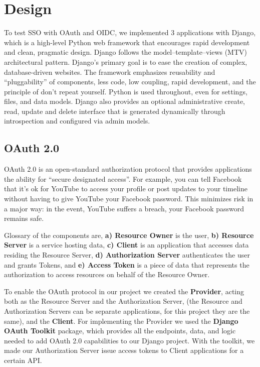 \section{Design}

To test SSO with OAuth and OIDC, we implemented 3 applications with Django, which is a high-level Python web framework that encourages rapid development and clean, pragmatic design. Django follows the model–template–views (MTV) architectural pattern. Django's primary goal is to ease the creation of complex, database-driven websites. The framework emphasizes reusability and ``pluggability'' of components, less code, low coupling, rapid development, and the principle of don't repeat yourself. Python is used throughout, even for settings, files, and data models. Django also provides an optional administrative create, read, update and delete interface that is generated dynamically through introspection and configured via admin models.



\subsection{OAuth 2.0}

OAuth 2.0 \cite{OAUTH} is an open-standard authorization protocol that provides applications the ability for ``secure designated access''. For example, you can tell Facebook that it’s ok for YouTube to access your profile or post updates to your timeline without having to give YouTube your Facebook password. This minimizes risk in a major way: in the event, YouTube suffers a breach, your Facebook password remains safe.

Glossary of the components are, \textbf{a) Resource Owner} is the user, \textbf{b) Resource Server} is a service hosting data, \textbf{c) Client} is an application that accesses data residing the Resource Server, \textbf{d) Authorization Server} authenticates the user and grants Tokens, and \textbf{e) Access Token} is a piece of data that represents the authorization to access resources on behalf of the Resource Owner.


To enable the OAuth protocol in our project we created the \textbf{Provider}, acting both as the Resource Server and the Authorization Server, (the Resource and Authorization Servers can be separate applications, for this project they are the same), and the \textbf{Client}.
For implementing the Provider we used the \textbf{Django OAuth Toolkit}\cite{oauthtoolkit} package, which provides all the endpoints, data, and logic needed to add OAuth 2.0 capabilities to our Django project.
With the toolkit, we made our Authorization Server issue access tokens to Client applications for a certain API.

